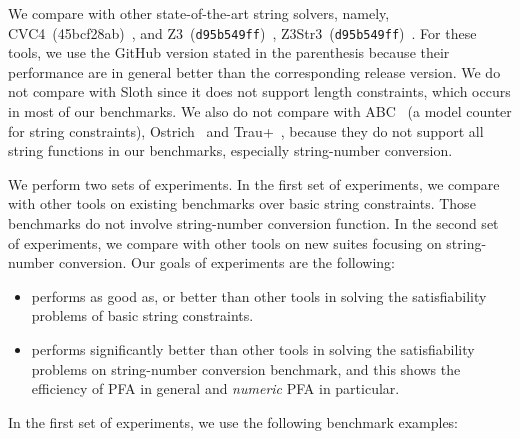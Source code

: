 We compare {\tool} with other state-of-the-art string solvers, namely, CVC4~(45bcf28ab)~\cite{cvc4Tool}, and Z3~(\texttt{d95b549ff})~\cite{z3}, \textsf{Z3Str3}~(\texttt{d95b549ff})~\cite{zheng2013z3}. For these tools, we use the GitHub version stated in the parenthesis because their performance are in general better than the corresponding release version. 
We do not compare with Sloth \cite{sloth} since it does not support length constraints, which occurs in most of our benchmarks. We also do not compare with ABC~\cite{aydin2018parameterized} (a model counter for string constraints), Ostrich~\cite{chen2019decision} and \textsf{Trau+}~\cite{abdulla2019chain}, because they do not support all string functions in our benchmarks, especially string-number conversion.

We perform two sets of experiments. In the first set of experiments, we compare {\tool} with other tools on existing benchmarks over basic string constraints. Those benchmarks do not involve string-number conversion function. In the second set of experiments, we compare {\tool} with other tools on new suites focusing on string-number conversion. Our goals of experiments are the following:
\smallskip


\begin{itemize}
	\item {\tool} performs as good as, or better than other tools in solving the  satisfiability problems of basic string constraints.
	
		\smallskip

	\item {\tool} performs significantly better than other tools in solving the satisfiability problems on string-number conversion benchmark, and this shows  the efficiency of PFA in general and \emph{numeric} PFA in particular.
\end{itemize}
		\smallskip

In the first set of experiments, we use the following benchmark examples:

		\smallskip


